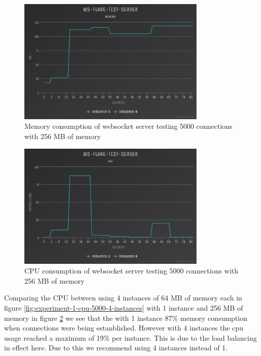 \begin{figure}[H]
  \centering
    \includegraphics[width=0.8\textwidth]{figures/experiments/experiment-1/node-js/memory-5000-256-memory.png}
    \caption{Memory consumption of websocket server testing 5000 connections with 256 MB of memory}
    \label{fig:experiment-1-memory-5000-1-instances-256-mem}
\end{figure}

\begin{figure}[H]
  \centering
    \includegraphics[width=0.8\textwidth]{figures/experiments/experiment-1/node-js/cpu-5000-256-memory.png}
    \caption{CPU consumption of websocket server testing 5000 connections with 256 MB of memory}
    \label{fig:experiment-1-cpu-5000-1-instances-256-mem}
\end{figure}

Comparing the CPU between using 4 instances of 64 MB of memory each in figure \ref{fig:experiment-1-cpu-5000-4-instances} with 1 instance and 256 MB of memory in figure \ref{fig:experiment-1-cpu-5000-1-instances-256-mem} we see that the with 1 instance 87\% memory consumption when connections were being estanblished. However with 4 instances the cpu usage reached a maximum of 19\% per instance. This is due to the load balancing in effect here. Due to this we recommend using 4 instances instead of 1. 


